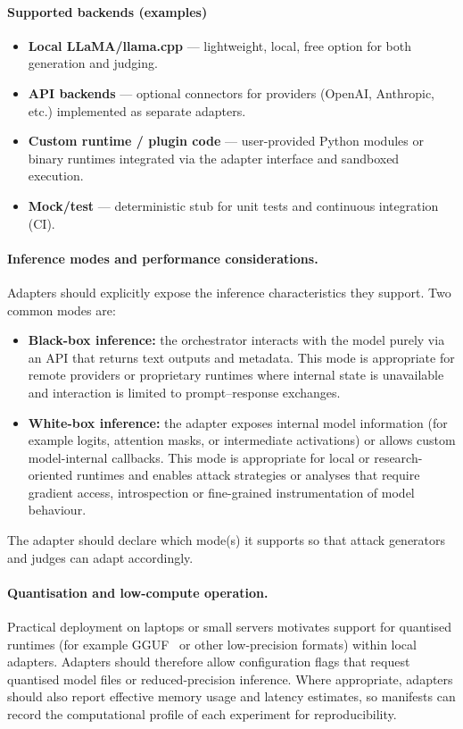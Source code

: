 \paragraph{Supported backends (examples)}
\begin{itemize}
  \item \textbf{Local LLaMA/llama.cpp} — lightweight, local, free option for both generation and judging.
  \item \textbf{API backends} — optional connectors for providers (OpenAI, Anthropic, etc.) implemented as separate adapters.
  \item \textbf{Custom runtime / plugin code} — user-provided Python modules or binary runtimes integrated via the adapter interface and sandboxed execution.
  \item \textbf{Mock/test} — deterministic stub for unit tests and continuous integration (CI).
\end{itemize}

\paragraph{Inference modes and performance considerations.}
Adapters should explicitly expose the inference characteristics they support. Two common modes are:
\begin{itemize}
  \item \textbf{Black-box inference:} the orchestrator interacts with the model purely via an API that returns text outputs and metadata.
  This mode is appropriate for remote providers or proprietary runtimes where internal state is unavailable and interaction is limited to prompt--response exchanges.
  \newpage{}
  \item \textbf{White-box inference:} the adapter exposes internal model information (for example logits, attention masks, or intermediate activations) or allows custom model-internal callbacks.
  This mode is appropriate for local or research-oriented runtimes and enables attack strategies or analyses that require gradient access, introspection or fine-grained instrumentation of model behaviour.
\end{itemize}
The adapter should declare which mode(s) it supports so that attack generators and judges can adapt accordingly.

\paragraph{Quantisation and low-compute operation.}
Practical deployment on laptops or small servers motivates support for quantised runtimes (for example GGUF~\cite{gerganov2023gguf} or other low-precision formats) within local adapters.
Adapters should therefore allow configuration flags that request quantised model files or reduced-precision inference.
Where appropriate, adapters should also report effective memory usage and latency estimates, so manifests can record the computational profile of each experiment for reproducibility.

